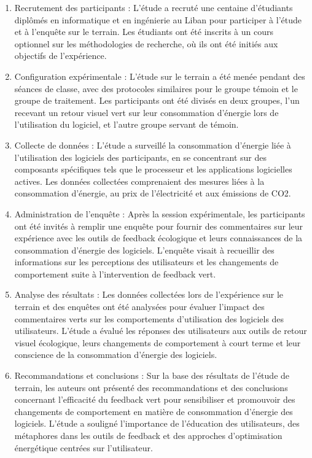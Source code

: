 \begin{enumerate}
    \item Recrutement des participants : L'étude a recruté une centaine d'étudiants diplômés en informatique et en ingénierie au Liban pour participer à l'étude et à l'enquête sur le terrain. Les étudiants ont été inscrits à un cours optionnel sur les méthodologies de recherche, où ils ont été initiés aux objectifs de l'expérience.
    \item Configuration expérimentale : L'étude sur le terrain a été menée pendant des séances de classe, avec des protocoles similaires pour le groupe témoin et le groupe de traitement. Les participants ont été divisés en deux groupes, l'un recevant un retour visuel vert sur leur consommation d'énergie lors de l'utilisation du logiciel, et l'autre groupe servant de témoin.
    \item Collecte de données : L'étude a surveillé la consommation d'énergie liée à l'utilisation des logiciels des participants, en se concentrant sur des composants spécifiques tels que le processeur et les applications logicielles actives. Les données collectées comprenaient des mesures liées à la consommation d'énergie, au prix de l'électricité et aux émissions de CO2.
    \item Administration de l'enquête : Après la session expérimentale, les participants ont été invités à remplir une enquête pour fournir des commentaires sur leur expérience avec les outils de feedback écologique et leurs connaissances de la consommation d'énergie des logiciels. L'enquête visait à recueillir des informations sur les perceptions des utilisateurs et les changements de comportement suite à l'intervention de feedback vert.
    \item Analyse des résultats : Les données collectées lors de l'expérience sur le terrain et des enquêtes ont été analysées pour évaluer l'impact des commentaires verts sur les comportements d'utilisation des logiciels des utilisateurs. L'étude a évalué les réponses des utilisateurs aux outils de retour visuel écologique, leurs changements de comportement à court terme et leur conscience de la consommation d'énergie des logiciels.
    \item Recommandations et conclusions : Sur la base des résultats de l'étude de terrain, les auteurs ont présenté des recommandations et des conclusions concernant l'efficacité du feedback vert pour sensibiliser et promouvoir des changements de comportement en matière de consommation d'énergie des logiciels. L'étude a souligné l'importance de l'éducation des utilisateurs, des métaphores dans les outils de feedback et des approches d'optimisation énergétique centrées sur l'utilisateur.
\end{enumerate}


